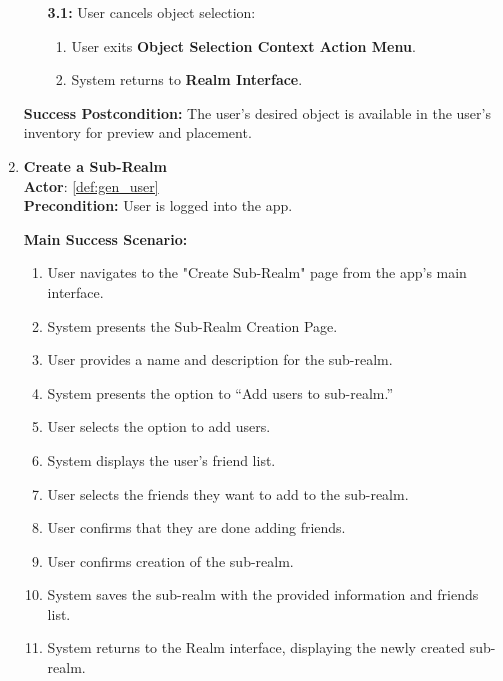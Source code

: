 \documentclass{article}
\begin{document}
\begin{enumerate}[label=\textbf{UC\arabic*}]
\begin{itemize}
              \item[{\bf 3.1:}] User cancels object selection:
                    \begin{enumerate}[label=\textbf{\arabic*.}]
                        \item User exits \textbf{Object Selection Context Action Menu}.
                        \item System returns to \textbf{Realm Interface}.
                    \end{enumerate}
          \end{itemize}

          \textbf{Success Postcondition:} The user’s desired object is available in the user’s inventory for preview and placement.


    \item \label{uc:17} \textbf{Create a Sub-Realm} \\
          \textbf{Actor}: \ref{def:gen_user} \\
          \textbf{Precondition:} User is logged into the app.

          \textbf{Main Success Scenario:}
          \begin{enumerate}[label=\textbf{\arabic*.}]
              \item User navigates to the "Create Sub-Realm" page from the app’s main interface.
              \item System presents the Sub-Realm Creation Page.
              \item User provides a name and description for the sub-realm.
              \item System presents the option to “Add users to sub-realm.”
              \item User selects the option to add users.
              \item System displays the user’s friend list.
              \item User selects the friends they want to add to the sub-realm.
              \item User confirms that they are done adding friends.
              \item User confirms creation of the sub-realm.
              \item System saves the sub-realm with the provided information and friends list.
              \item System returns to the Realm interface, displaying the newly created sub-realm.
          \end{enumerate}


\end{enumerate}
\end{document}
